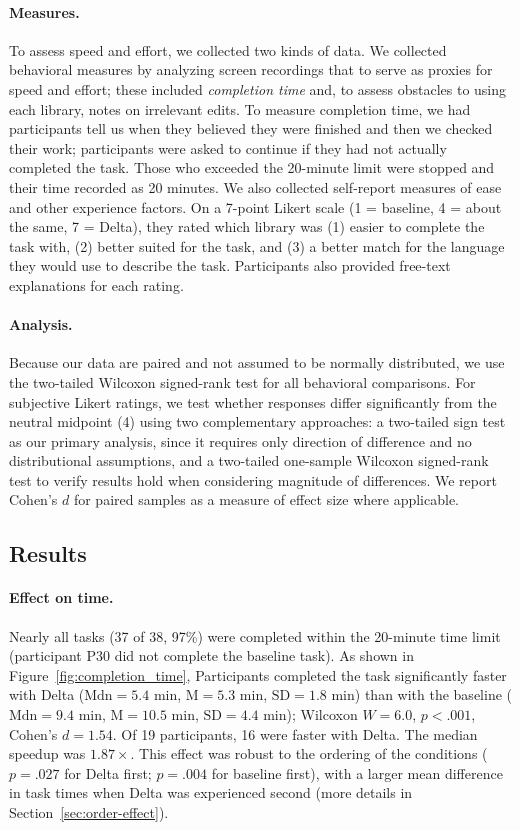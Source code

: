 \paragraph{Measures.} To assess speed and effort, we collected two kinds of data. We collected behavioral measures by analyzing screen recordings that to serve as proxies for speed and effort; these included \textit{completion time} and, to assess obstacles to using each library, notes on irrelevant edits. To measure completion time, we had participants tell us when they believed they were finished and then we checked their work; participants were asked to continue if they had not actually completed the task. Those who exceeded the 20-minute limit were stopped and their time recorded as 20 minutes. We also collected self-report measures of ease and other experience factors. On a 7-point Likert scale (1 = baseline, 4 = about the same, 7 = Delta), they rated which library was (1) easier to complete the task with, (2) better suited for the task, and (3) a better match for the language they would use to describe the task. Participants also provided free-text explanations for each rating.

\paragraph{Analysis.} Because our data are paired and not assumed to be normally distributed, we use the two-tailed Wilcoxon signed-rank test for all behavioral comparisons. For subjective Likert ratings, we test whether responses differ significantly from the neutral midpoint (4) using two complementary approaches: a two-tailed sign test as our primary analysis, since it requires only direction of difference and no distributional assumptions, and a two-tailed one-sample Wilcoxon signed-rank test to verify results hold when considering magnitude of differences. We report Cohen's $d$ for paired samples as a measure of effect size where applicable.

\subsection{Results}

\paragraph{Effect on time.}
Nearly all tasks (37 of 38, 97\%) were completed within the 20-minute time limit (participant P30 did not complete the baseline task). As shown in Figure~\ref{fig:completion_time}, Participants completed the task significantly faster with Delta ($\text{Mdn} = 5.4$ min, $\text{M} = 5.3$ min, $\text{SD} = 1.8$ min) than with the baseline ($\text{Mdn} = 9.4$ min, $\text{M} = 10.5$ min, $\text{SD} = 4.4$ min); Wilcoxon $W = 6.0$, $p < .001$, Cohen's $d = 1.54$. Of 19 participants, 16 were faster with Delta. The median speedup was $1.87\times$. This effect was robust to the ordering of the conditions ($p = .027$ for Delta first; $p = .004$ for baseline first), with a larger mean difference in task times when Delta was experienced second (more details in Section~\ref{sec:order-effect}).

